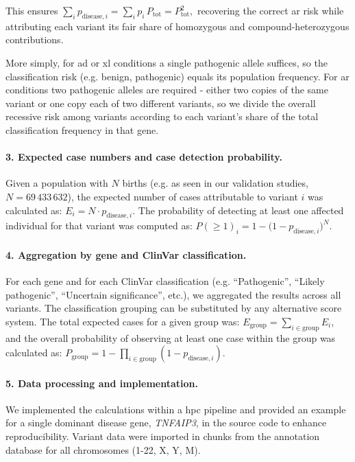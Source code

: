 This ensures
$
\sum_i p_{\text{disease},i}
= \sum_i p_i\,P_{\text{tot}}
= P_{\text{tot}}^2,
$
recovering the correct \ac{ar} risk while attributing each variant its fair share of homozygous and compound-heterozygous contributions.

More simply, for \ac{ad} or \ac{xl} conditions a single pathogenic allele suffices, so the classification risk (e.g. benign, pathogenic) equals its population frequency. For \ac{ar} conditions two pathogenic alleles are required - either two copies of the same variant or one copy each of two different variants, so we divide the overall recessive risk among variants according to each variant’s share of the total classification frequency in that gene.

\paragraph{3. Expected case numbers and case detection probability.}
Given a population with \(N\) births (e.g. as seen in our validation studies, \(N = 69\,433\,632\)), the expected number of cases attributable to variant \(i\) was calculated as:
$E_i = N \cdot p_{\text{disease},i}$.
The probability of detecting at least one affected individual for that variant was computed as:
$P(\geq 1)_i = 1 - \bigl(1 - p_{\text{disease},i}\bigr)^N$.

\paragraph{4. Aggregation by gene and ClinVar classification.}
For each gene and for each ClinVar classification (e.g. ``Pathogenic'', ``Likely pathogenic'', ``Uncertain significance'', etc.), we aggregated the results across all variants. The classification grouping can be substituted by any alternative score system. The total expected cases for a given group was:
$E_{\text{group}} = \sum_{i \in \text{group}} E_i$,
and the overall probability of observing at least one case within the group was calculated as:
$P_{\text{group}} = 1 - \prod_{i \in \text{group}} \left(1 - p_{\text{disease},i}\right)$.

\paragraph{5. Data processing and implementation.}
We implemented the calculations within a \ac{hpc} pipeline and provided an example for a single dominant disease gene, \textit{TNFAIP3}, in the source code to enhance reproducibility. Variant data were imported in chunks from the annotation database for all chromosomes (1-22, X, Y, M). 


